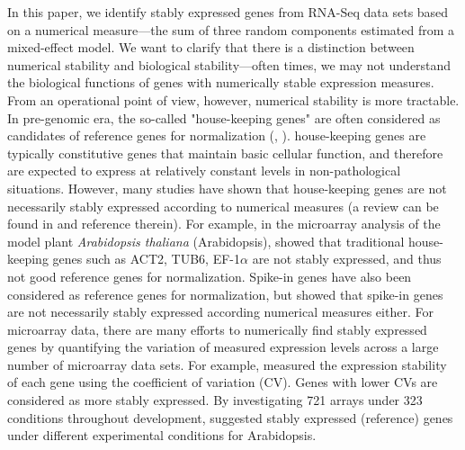 \documentclass[11pt, a4paper]{article}
\begin{document}
In this paper, we identify stably expressed genes from RNA-Seq data sets based
on a numerical measure---the sum of three random components estimated from a
mixed-effect model.  We want to clarify that there is a distinction between
numerical stability and biological stability---often times, we may not
understand the biological functions of genes with numerically stable
expression measures.  From an operational point of view, however, numerical
stability is more tractable.  In pre-genomic era, the so-called "house-keeping
genes" are often considered as candidates of reference genes for
normalization (\cite{bustin2002quantification},
\cite{andersen2004normalization}). house-keeping
genes are typically constitutive genes that
maintain basic cellular function, and therefore are expected to express at
relatively constant levels in non-pathological situations.  However, many
studies have shown that house-keeping
genes are not necessarily stably expressed according to
numerical measures (a review can be found in \cite{huggett2005real} and
reference therein).  For example, in the microarray analysis of the model
plant \textit{Arabidopsis thaliana} (Arabidopsis), \cite{czechowski2005genome}
showed that traditional house-keeping
genes such as ACT2, TUB6, EF-1$\alpha$ are not stably
expressed, and thus not good reference genes for normalization.  Spike-in
genes have also been considered as reference genes for normalization, but
\cite{risso2014nat} showed that spike-in genes are not necessarily stably
expressed according numerical measures either.  
For microarray data, there are many efforts to numerically find stably
expressed genes by quantifying the variation of measured expression levels
across a large number of microarray data sets.  For example,
\cite{czechowski2005genome} measured the expression stability of each gene
using the coefficient of variation (CV). Genes with lower CVs are considered
as more stably expressed.  By investigating 721 arrays under 323 conditions
throughout development, \cite{czechowski2005genome} suggested stably expressed
(reference) genes under different experimental conditions for Arabidopsis.
\end{document}
